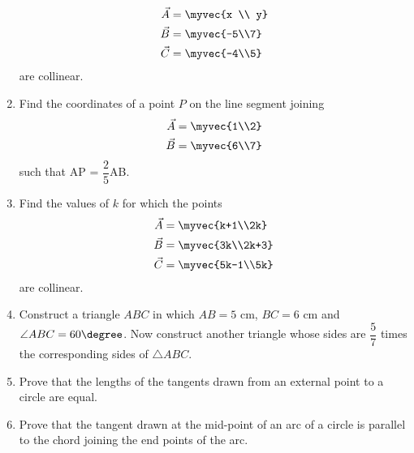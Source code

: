 \begin{enumerate}
\begin{align*}
\vec{A}&=\myvec{x \\ y}\\ 
\vec{B}&=\myvec{-5\\7}\\
\vec{C}&=\myvec{-4\\5} 
\end{align*}
are collinear.
\item Find the coordinates of a point $P$ on the line segment joining
\begin{align*}
\vec{A} &= \myvec{1\\2}\\
\vec{B} &= \myvec{6\\7}
\end{align*}
such that AP = $\dfrac{2}{5}$AB.
\item Find the values of $k$ for which the points
\begin{align*}
\vec{A} &= \myvec{k+1\\2k}\\
\vec{B} &= \myvec{3k\\2k+3}\\
\vec{C} &= \myvec{5k-1\\5k}
\end{align*}
are collinear.
\item Construct a triangle $ABC$ in which $AB = 5$ cm, $BC = 6$ cm and $\angle ABC = 60\degree$. Now construct another triangle whose sides are $\dfrac{5}{7}$ times the corresponding sides of $\triangle ABC$.
\item Prove that the lengths of the tangents drawn from an external point to a circle are equal.
\item Prove that the tangent drawn at the mid-point of an arc of a circle is parallel to the chord joining the end points of the arc.

\end{enumerate}
